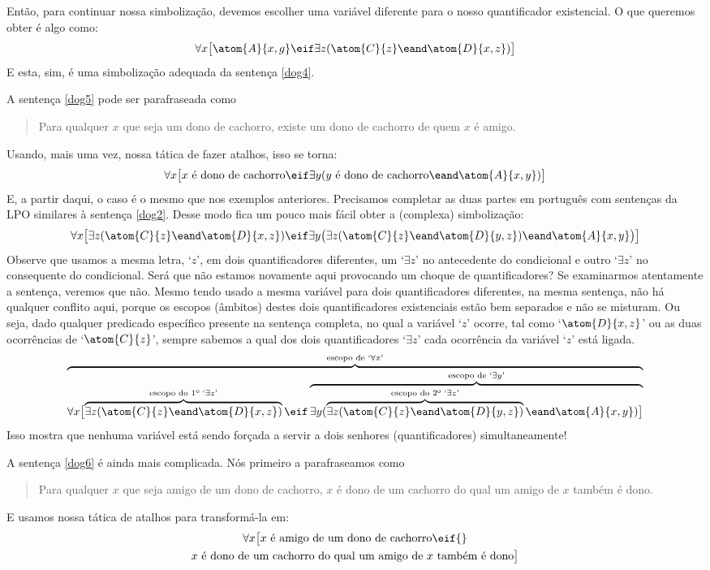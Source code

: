 Então, para continuar nossa simbolização, devemos escolher uma variável diferente para o nosso quantificador existencial. O que queremos obter é algo como:
$$\forall x\bigl[\atom{A}{x,g} \eif\exists z(\atom{C}{z} \eand \atom{D}{x,z})\bigr]$$
E esta, sim, é uma simbolização adequada da sentença \ref{dog4}.

A sentença \ref{dog5} pode ser parafraseada como
\begin{quote}
	Para qualquer $x$ que seja um dono de cachorro, existe um dono de cachorro de quem $x$ é amigo.	
\end{quote}
Usando, mais uma vez, nossa tática de fazer atalhos, isso se torna:
$$\forall x\bigl[\mbox{$x$ é dono de cachorro}\eif\exists y(\mbox{$y$ é dono de cachorro}\eand \atom{A}{x,y})\bigr]$$
E, a partir daqui, o caso é o mesmo que nos exemplos anteriores.
Precisamos completar as duas partes em português com sentenças da LPO similares à sentença \ref{dog2}.
Desse modo fica um pouco mais fácil obter a (complexa) simbolização:
$$\forall x\bigl[\exists z(\atom{C}{z} \eand \atom{D}{x,z})\eif\exists y\bigl(\exists z(\atom{C}{z} \eand \atom{D}{y,z})\eand \atom{A}{x,y}\bigr)\bigr]$$
Observe que usamos a mesma letra, `$z$', em dois quantificadores diferentes, um `$\exists z$' no antecedente do condicional e outro `$\exists z$' no consequente do condicional.
Será que não estamos novamente aqui provocando um choque de quantificadores? 
Se examinarmos atentamente a sentença, veremos que não.
Mesmo tendo usado a mesma variável para dois quantificadores diferentes, na mesma sentença, não há qualquer conflito aqui, porque os escopos (âmbitos) destes dois quantificadores existenciais estão bem separados e não se misturam.
Ou seja, dado qualquer predicado específico presente na sentença completa, no qual a variável `$z$' ocorre, tal como `$\atom{D}{x,z}$' ou as duas ocorrências de `$\atom{C}{z}$', sempre sabemos a qual dos dois quantificadores `$\exists z$' cada ocorrência da variável `$z$' está ligada.
$$\overbrace{\forall x\bigl[\overbrace{\exists z(\atom{C}{z} \eand \atom{D}{x,z})}^{\text{escopo do 1º `}\exists z\text{'}}\eif \overbrace{\exists y(\overbrace{\exists z(\atom{C}{z} \eand \atom{D}{y,z})}^{\text{escopo do 2º `}\exists z\text{'}}\eand \atom{A}{x,y})\bigr]}^{\text{escopo de `}\exists y\text{'}}}^{\text{escopo de `}\forall x\text{'}}$$
Isso mostra que nenhuma variável está sendo forçada a servir a dois senhores (quantificadores) simultaneamente!

A sentença \ref{dog6} é ainda mais complicada.
Nós primeiro a parafraseamos como
\begin{quote}
	Para qualquer $x$ que seja amigo de um dono de cachorro, $x$ é dono de um cachorro do qual um amigo de $x$ também é dono.
\end{quote}
E usamos nossa tática de atalhos para transformá-la em:
\footnotesize
\begin{multline*}
\forall x\bigl[x\text{ é amigo de um dono de cachorro}\eif {}\\
x\text{ é dono de um cachorro do qual um amigo de $x$ também é dono}\bigr]
\end{multline*}

